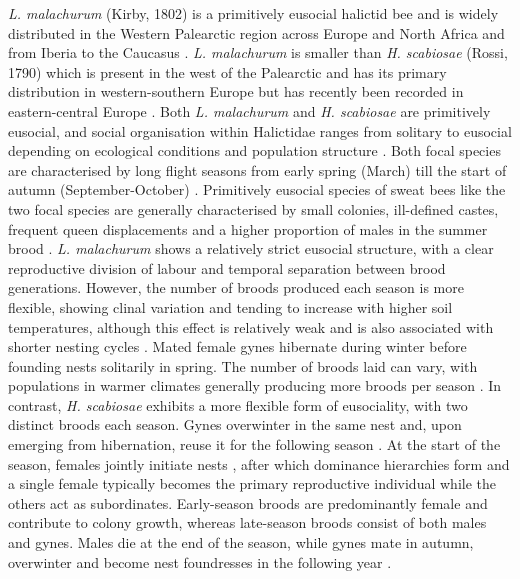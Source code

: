 \documentclass[11pt,a4paper]{article}
\begin{document}
\textit{L. malachurum} (Kirby, 1802) is a primitively eusocial halictid bee and is widely distributed in the Western Palearctic region across Europe and North Africa and from Iberia to the Caucasus \citep{Polidori2010, Knerer1992, Michener1979}. \textit{L. malachurum} is smaller than \textit{H. scabiosae} (Rossi, 1790) which is present in the west of the Palearctic and has its primary distribution in western-southern Europe but has recently been recorded in eastern-central Europe \citep{Gil2024, Pauly2016}. Both \textit{L. malachurum} and \textit{H. scabiosae} are primitively eusocial, and social organisation within Halictidae ranges from solitary to eusocial depending on ecological conditions and population structure \citep{Gonzalez2024a}. Both focal species are characterised by long flight seasons from early spring (March) till the start of autumn (September-October) \citep{Gogala1991, Knerer1980, Weissel2006, Brand2012}. Primitively eusocial species of sweat bees like the two focal species are generally characterised by small colonies, ill-defined castes, frequent queen displacements and a higher proportion of males in the summer brood \citep{Knerer1969}. \textit{L. malachurum} shows a relatively strict eusocial structure, with a clear reproductive division of labour and temporal separation between brood generations. However, the number of broods produced each season is more flexible, showing clinal variation and tending to increase with higher soil temperatures, although this effect is relatively weak and is also associated with shorter nesting cycles \citep{Weissel2006}. Mated female gynes hibernate during winter before founding nests solitarily in spring. The number of broods laid can vary, with populations in warmer climates generally producing more broods per season \citep{Knerer1992, Richards2000}. In contrast, \textit{H. scabiosae} exhibits a more flexible form of eusociality, with two distinct broods each season. Gynes overwinter in the same nest and, upon emerging from hibernation, reuse it for the following season \citep{Lienhard2010}. At the start of the season, females jointly initiate nests \citep{Gogala1991}, after which dominance hierarchies form and a single female typically becomes the primary reproductive individual while the others act as subordinates. Early-season broods are predominantly female \citep{Knerer1967} and contribute to colony growth, whereas late-season broods consist of both males and gynes. Males die at the end of the season, while gynes mate in autumn, overwinter and become nest foundresses in the following year \citep{Gogala1991}.
\end{document}
